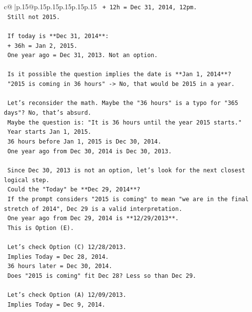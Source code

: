 \documentclass{article}
\begin{document}
{\begin{supertabular}{c@{$\;$}|p{.15\linewidth}@{}p{.15\linewidth}p{.15\linewidth}p{.15\linewidth}p{.15\linewidth}p{.15\linewidth}}
{{{\texttt{    + 12h = Dec 31, 2014, 12pm.} \\
\texttt{    Still not 2015.} \\
\\ 
\texttt{    If today is **Dec 31, 2014**:} \\
\texttt{    + 36h = Jan 2, 2015.} \\
\texttt{    One year ago = Dec 31, 2013. Not an option.} \\
\\ 
\texttt{    Is it possible the question implies the date is **Jan 1, 2014**?} \\
\texttt{    "2015 is coming in 36 hours" {-}> No, that would be 2015 in a year.} \\
\\ 
\texttt{    Let's reconsider the math. Maybe the "36 hours" is a typo for "365 days"? No, that's absurd.} \\
\texttt{    Maybe the question is: "It is 36 hours until the year 2015 starts."} \\
\texttt{    Year starts Jan 1, 2015.} \\
\texttt{    36 hours before Jan 1, 2015 is Dec 30, 2014.} \\
\texttt{    One year ago from Dec 30, 2014 is Dec 30, 2013.} \\
\\ 
\texttt{    Since Dec 30, 2013 is not an option, let's look for the next closest logical step.} \\
\texttt{    Could the "Today" be **Dec 29, 2014**?} \\
\texttt{    If the prompt considers "2015 is coming" to mean "we are in the final stretch of 2014", Dec 29 is a valid interpretation.} \\
\texttt{    One year ago from Dec 29, 2014 is **12/29/2013**.} \\
\texttt{    This is Option (E).} \\
\\ 
\texttt{    Let's check Option (C) 12/28/2013.} \\
\texttt{    Implies Today = Dec 28, 2014.} \\
\texttt{    36 hours later = Dec 30, 2014.} \\
\texttt{    Does "2015 is coming" fit Dec 28? Less so than Dec 29.} \\
\\ 
\texttt{    Let's check Option (A) 12/09/2013.} \\
\texttt{    Implies Today = Dec 9, 2014.} \\
}}}
\end{supertabular}}
\end{document}

